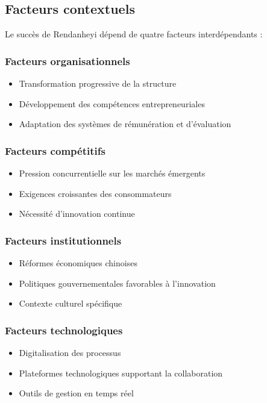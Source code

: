 \documentclass[12pt,a4paper]{article}
\begin{document}
\subsection{Facteurs contextuels}

Le succès de Rendanheyi dépend de quatre facteurs interdépendants :

\subsubsection{Facteurs organisationnels}
\begin{itemize}
    \item Transformation progressive de la structure
    \item Développement des compétences entrepreneuriales
    \item Adaptation des systèmes de rémunération et d'évaluation
\end{itemize}

\subsubsection{Facteurs compétitifs}
\begin{itemize}
    \item Pression concurrentielle sur les marchés émergents
    \item Exigences croissantes des consommateurs
    \item Nécessité d'innovation continue
\end{itemize}

\subsubsection{Facteurs institutionnels}
\begin{itemize}
    \item Réformes économiques chinoises
    \item Politiques gouvernementales favorables à l'innovation
    \item Contexte culturel spécifique
\end{itemize}

\subsubsection{Facteurs technologiques}
\begin{itemize}
    \item Digitalisation des processus
    \item Plateformes technologiques supportant la collaboration
    \item Outils de gestion en temps réel
\end{itemize}
\end{document}
